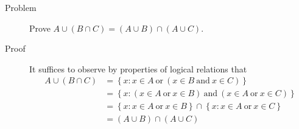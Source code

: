 \begin{description}
\item[Problem]
Prove $A \cup (B \cap C) = (A \cup B) \cap (A \cup C)$.

\item[Proof]

It suffices to observe by properties of logical relations that
\begin{equation*}
\begin{aligned}
A \cup (B \cap C) &= \left\{ x : x \in A\ \text{or}\ (x \in B\ \text{and}\ x
                       \in C) \right\}\\
                  &= \left\{ x : (x \in A\ \text{or}\ x \in B)\ \text{and}\ (x
                       \in A\ \text{or}\ x \in C) \right\}\\
                  &= \left\{ x : x \in A\ \text{or}\ x \in B\right\} \cap
                       \left\{ x : x \in A\ \text{or}\ x \in C \right\}\\
                  &= (A \cup B) \cap (A \cup C)
\end{aligned}
\end{equation*}

\end{description}
